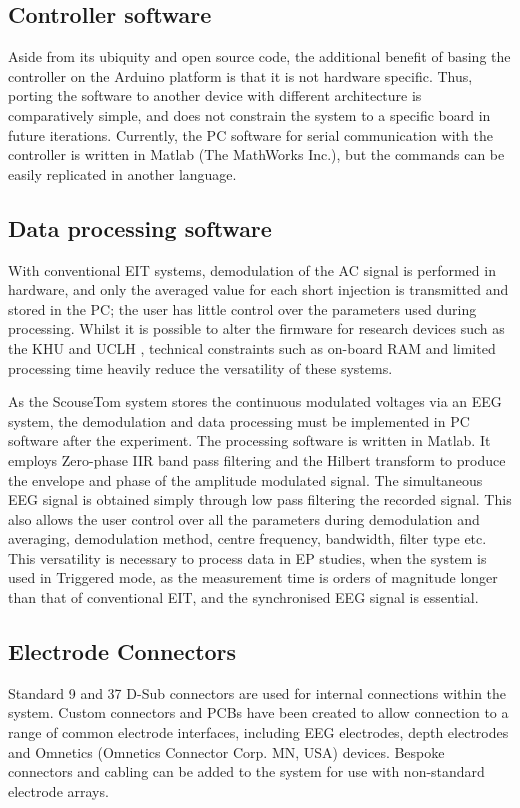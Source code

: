 
\subsection{Controller software}

Aside from its ubiquity and open source code, the additional benefit of basing the controller on the Arduino platform is that it is not hardware specific. Thus, porting the software to another device with different architecture is comparatively simple, and does not constrain the system to a specific board in future iterations. Currently, the PC software for serial communication with the controller is written in Matlab (The MathWorks Inc.), but the commands can be easily replicated in another language.

\subsection{Data processing software}

With conventional EIT systems, demodulation of the AC signal is performed in hardware, and only the averaged value for each short injection is transmitted and stored in the PC; the user has little control over the parameters used during processing. Whilst it is possible to alter the firmware for research devices such as the KHU \cite{Hun_Wi_2014} and UCLH \cite{McEwan_2006}, technical constraints such as on-board RAM and limited processing time heavily reduce the versatility of these systems. 

As the ScouseTom system stores the continuous modulated voltages via an EEG system, the demodulation and data processing must be implemented in PC software after the experiment. The processing software is written in Matlab. It employs Zero-phase IIR band pass filtering and the Hilbert transform to produce the envelope and phase of the amplitude modulated signal. The simultaneous EEG signal is obtained simply through low pass filtering the recorded signal. This also allows the user control over all the parameters during demodulation and averaging, demodulation method, centre frequency, bandwidth, filter type etc. This versatility is necessary to process data in EP studies, when the system is used in Triggered mode, as the measurement time is orders of magnitude longer than that of conventional EIT, and the synchronised EEG signal is essential. 

\subsection{Electrode Connectors}

Standard 9 and 37 D-Sub connectors are used for internal connections within the system. Custom connectors and PCBs have been created to allow connection to a range of common electrode interfaces, including EEG electrodes, depth electrodes and Omnetics (Omnetics Connector Corp. MN, USA) devices. Bespoke connectors and cabling can be added to the system for use with non-standard electrode arrays.